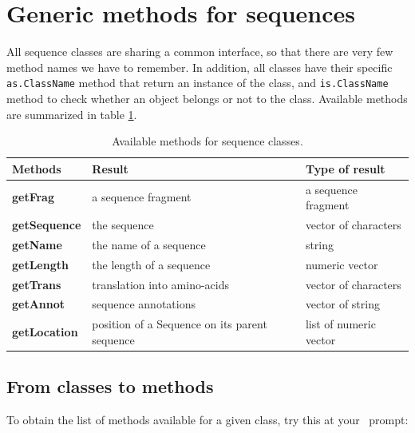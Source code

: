 \documentclass{article}
\begin{document}
\section{Generic methods for sequences}

All sequence classes are sharing a common interface, so that there are very few method names we 
have to remember. 
In addition, all classes have their specific \texttt{as.ClassName} method that return an 
instance of the class, and \texttt{is.ClassName} method to check whether an object belongs 
or not to the class. Available methods are summarized in table \ref{tabmeth}.

\begin{table} 
\begin{tabular}{lll}
\hline \hline
{\bfseries Methods} & {\bfseries Result} & {\bfseries Type of result} \\
\hline
{\bfseries getFrag} & a sequence fragment & a sequence fragment \\
{\bfseries getSequence} & the sequence & vector of characters \\
{\bfseries getName} & the name of a sequence & string \\
{\bfseries getLength} & the length of a sequence & numeric vector \\
{\bfseries getTrans} & translation into amino-acids & vector of characters \\
{\bfseries getAnnot} & sequence annotations & vector of string \\
{\bfseries getLocation} & position of a Sequence on its parent sequence & list of numeric vector \\
\hline \hline
\end{tabular}
\caption{Available methods for sequence classes.}
\label{tabmeth}
\end{table}

\subsection{From classes to methods}

To obtain the list of methods available for a given class, try this at your \Rlogo{}~prompt:
\end{document}
